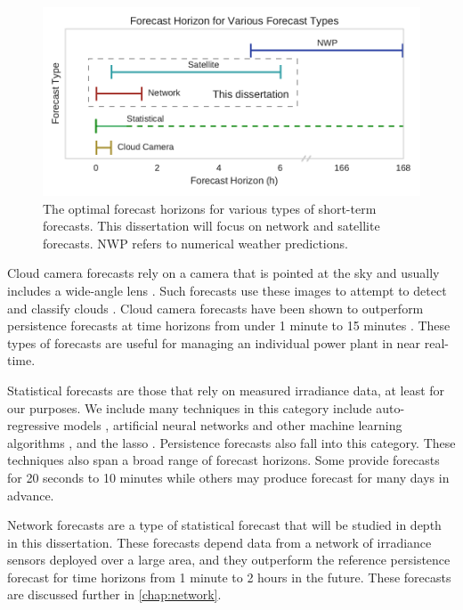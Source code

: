 \begin{figure}[tbh]
\includegraphics[width=\textwidth]{figs/fxhoriz.pdf}
\caption[Forecast horizon for various forecast types]{The optimal
  forecast horizons for various types of short-term forecasts. This
  dissertation will focus on network and satellite forecasts. NWP
  refers to numerical weather predictions.}
\label{fig:fxhoriz}
\end{figure}

Cloud camera forecasts rely on a camera that is pointed at the sky and
usually includes a wide-angle lens \citep{Urquhart2013}.
Such forecasts use these images to attempt to detect and classify
clouds \citep{Ghonima2012}.
Cloud camera forecasts have been shown to outperform persistence
forecasts at time horizons from under 1 minute to 15 minutes
\citep{Yang2014a}.
These types of forecasts are useful for managing an individual power
plant in near real-time.

Statistical forecasts are those that rely on measured irradiance data,
at least for our purposes.
We include many techniques in this category include auto-regressive
models \citep{Yang2014}, artificial neural networks
\citep{Gutierrez-Corea2016} and other machine learning algorithms
\citep{Pedro2012,Mellit2008}, and the lasso \citep{Yang2015a}.
Persistence forecasts also fall into this category.
These techniques also span a broad range of forecast horizons.
Some provide forecasts for 20 seconds to 10 minutes while others may
produce forecast for many days in advance.

Network forecasts are a type of statistical forecast that will be
studied in depth in this dissertation.
These forecasts depend data from a network of irradiance sensors
deployed over a large area, and they outperform the reference
persistence forecast for time horizons from 1 minute to 2 hours in the
future.
These forecasts are discussed further in \cref{chap:network}.

